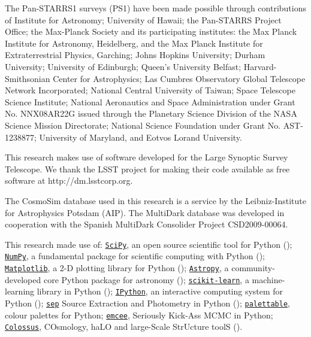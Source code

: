\documentclass[fleqn,usenatbib,useAMS]{mnras}
\begin{document}
  The Pan-STARRS1 surveys (PS1) have been made possible through contributions of
  Institute for Astronomy; University of Hawaii; the Pan-STARRS Project Office;
  the Max-Planck Society and its participating institutes: the Max Planck Institute
  for Astronomy, Heidelberg, and the Max Planck Institute for Extraterrestrial Physics,
  Garching; Johns Hopkins University; Durham University; University of Edinburgh;
  Queen's University Belfast; Harvard-Smithsonian Center for Astrophysics; Las
  Cumbres Observatory Global Telescope Network Incorporated; National Central
  University of Taiwan; Space Telescope Science Institute; National Aeronautics
  and Space Administration under Grant No. NNX08AR22G issued through the Planetary
  Science Division of the NASA Science Mission Directorate; National Science
  Foundation under Grant No. AST-1238877; University of Maryland, and Eotvos
  Lorand University.

  This research makes use of software developed for the Large Synoptic Survey
  Telescope. We thank the LSST project for making their code available as free
  software at http://dm.lsstcorp.org.

  The CosmoSim database used in this research is a service by the Leibniz-Institute for
  Astrophysics Potsdam (AIP).
  The MultiDark database was developed in cooperation with the Spanish MultiDark
  Consolider Project CSD2009-00064.

  This research made use of:
  \href{http://www.scipy.org/}{\texttt{SciPy}},
      an open source scientific tool for Python (\citealt{SciPy});
  \href{http://www.numpy.org/}{\texttt{NumPy}},
      a fundamental package for scientific computing with Python (\citealt{NumPy});
  \href{http://matplotlib.org/}{\texttt{Matplotlib}},
      a 2-D plotting library for Python (\citealt{Matplotlib});
  \href{http://www.astropy.org/}{\texttt{Astropy}}, a community-developed
      core Python package for astronomy (\citealt{AstroPy});
  \href{http://scikit-learn.org/stable/index.html}{\texttt{scikit-learn}},
      a machine-learning library in Python (\citealt{scikit-learn});
  \href{https://ipython.org}{\texttt{IPython}},
      an interactive computing system for Python (\citealt{IPython});
  \href{https://github.com/kbarbary/sep}{\texttt{sep}}
      Source Extraction and Photometry in Python (\citealt{PythonSEP});
  \href{https://jiffyclub.github.io/palettable/}{\texttt{palettable}},
      colour palettes for Python;
  \href{http://dan.iel.fm/emcee/current/}{\texttt{emcee}},
      Seriously Kick-Ass MCMC in Python;
  \href{http://bdiemer.bitbucket.org/}{\texttt{Colossus}},
      COsmology, haLO and large-Scale StrUcture toolS (\citealt{COLOSSUS}).
\end{document}
